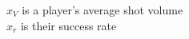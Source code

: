 \documentclass[preview]{standalone}
\begin{document}
\begin{center}
$x_V$ is a player's average shot volume \\$x_r$ is their success rate
\end{center}
\end{document}
